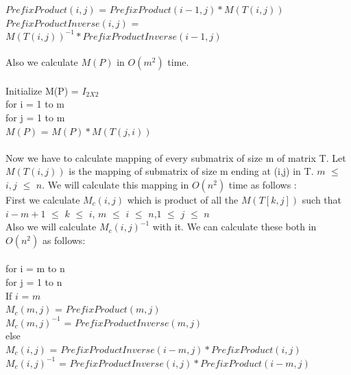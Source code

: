 \documentclass{article}
\begin{document}
\hspace*{2cm} $PrefixProduct(i,j)$ = $PrefixProduct(i-1,j)*M(T(i,j))$ \\
\hspace*{2cm} $PrefixProductInverse(i,j)$ = $M(T(i,j))^{-1}*PrefixProductInverse(i-1,j)$ \\ \\
Also we calculate $M(P)$ in $O(m^{2})$ time. \\\\ 
Initialize M(P) = $I_{2X2}$ \\
for i = 1 to m \\ 
\hspace*{1cm}for j = 1 to m \\  
\hspace*{2cm} $M(P)$ = $M(P) * M(T(j,i))$ \\\\
Now we have to calculate mapping of every submatrix of size m of matrix T. Let $M(T(i,j))$ is the mapping of submatrix of size m ending at (i,j) in T. $m$ $\leq$ $i,j$ $\leq$ $n$. We will calculate this mapping in $O(n^{2})$ time as follows : \\
First we calculate $M_c(i,j)$ which is product of all the $M(T[k,j])$
such that $i - m + 1$ $\leq$ $k$ $\leq$ $i$, $m$ $\leq$ $i$ $\leq$ $n$,$1$ $\leq$ $j$ $\leq$ $n$ \\
Also we will calculate $M_c(i,j)^{-1}$ with it. 
We can calculate these both in $O(n^{2})$ as follows:\\\\
\hspace*{1cm}for i = m to n \\
\hspace*{2cm}	for j = 1 to n\\ 
\hspace*{3cm} If $i$ = $m$ \\
\hspace*{4cm} $M_c(m,j)$ = $PrefixProduct(m,j)$ \\
\hspace*{4cm} $M_c(m,j)^{-1}$ = $PrefixProductInverse(m,j)$ \\
\hspace*{3cm}else \\
\hspace*{4cm} $M_c(i,j)$ = $PrefixProductInverse(i-m,j)*PrefixProduct(i,j)$ \\
\hspace*{4cm} $M_c(i,j)^{-1}$ = $PrefixProductInverse(i,j)*PrefixProduct(i-m,j)$ \\\\
\end{document}
